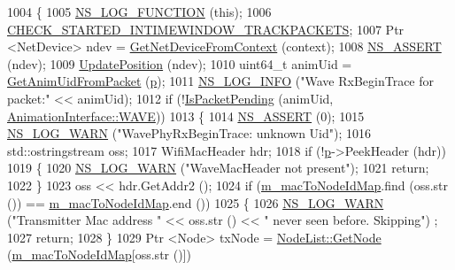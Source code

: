 \begin{DoxyCode}
1004 \{
1005   \hyperlink{log-macros-disabled_8h_a90b90d5bad1f39cb1b64923ea94c0761}{NS\_LOG\_FUNCTION} (\textcolor{keyword}{this});
1006   \hyperlink{animation-interface_8h_acdf351a3155a6ccf1813189e10dba8f5}{CHECK\_STARTED\_INTIMEWINDOW\_TRACKPACKETS};
1007   Ptr <NetDevice> ndev = \hyperlink{classns3_1_1AnimationInterface_a5054e94f0c5e3d0a4443cfbe52e2ea30}{GetNetDeviceFromContext} (context);
1008   \hyperlink{assert_8h_a6dccdb0de9b252f60088ce281c49d052}{NS\_ASSERT} (ndev);
1009   \hyperlink{classns3_1_1AnimationInterface_ab751cf6f459289f0978f4bb97b93044d}{UpdatePosition} (ndev);
1010   uint64\_t animUid = \hyperlink{classns3_1_1AnimationInterface_a18e6a184ccd7dee800bf734f8adc818c}{GetAnimUidFromPacket} (\hyperlink{lte__link__budget_8m_ac9de518908a968428863f829398a4e62}{p});
1011   \hyperlink{group__logging_gafbd73ee2cf9f26b319f49086d8e860fb}{NS\_LOG\_INFO} (\textcolor{stringliteral}{"Wave RxBeginTrace for packet:"} << animUid);
1012   \textcolor{keywordflow}{if} (!\hyperlink{classns3_1_1AnimationInterface_a0bee27aa30e136d5035050ec2ef0012d}{IsPacketPending} (animUid, \hyperlink{classns3_1_1AnimationInterface_a801a4efd553ff0d1d768cd70d22456b6a090868db2e88c7d4d576d145ef25ab93}{AnimationInterface::WAVE}))
1013     \{
1014       \hyperlink{assert_8h_a6dccdb0de9b252f60088ce281c49d052}{NS\_ASSERT} (0);
1015       \hyperlink{group__logging_gade7208b4009cdf0e25783cd26766f559}{NS\_LOG\_WARN} (\textcolor{stringliteral}{"WavePhyRxBeginTrace: unknown Uid"});
1016       std::ostringstream oss;
1017       WifiMacHeader hdr;
1018       \textcolor{keywordflow}{if} (!\hyperlink{lte__link__budget_8m_ac9de518908a968428863f829398a4e62}{p}->PeekHeader (hdr))
1019       \{
1020         \hyperlink{group__logging_gade7208b4009cdf0e25783cd26766f559}{NS\_LOG\_WARN} (\textcolor{stringliteral}{"WaveMacHeader not present"});
1021         \textcolor{keywordflow}{return};
1022       \}
1023       oss << hdr.GetAddr2 ();
1024       \textcolor{keywordflow}{if} (\hyperlink{classns3_1_1AnimationInterface_a4d47d5b16cac7965cc0fbb1c50b3a268}{m\_macToNodeIdMap}.find (oss.str ()) == \hyperlink{classns3_1_1AnimationInterface_a4d47d5b16cac7965cc0fbb1c50b3a268}{m\_macToNodeIdMap}.end ())
1025       \{
1026         \hyperlink{group__logging_gade7208b4009cdf0e25783cd26766f559}{NS\_LOG\_WARN} (\textcolor{stringliteral}{"Transmitter Mac address "} << oss.str () << \textcolor{stringliteral}{" never seen before. Skipping"})
      ;
1027         \textcolor{keywordflow}{return};
1028       \}
1029       Ptr <Node> txNode = \hyperlink{classns3_1_1NodeList_a80ac09977d48d29db5c704ac8483cf6c}{NodeList::GetNode} (\hyperlink{classns3_1_1AnimationInterface_a4d47d5b16cac7965cc0fbb1c50b3a268}{m\_macToNodeIdMap}[oss.str ()])

\end{DoxyCode}
